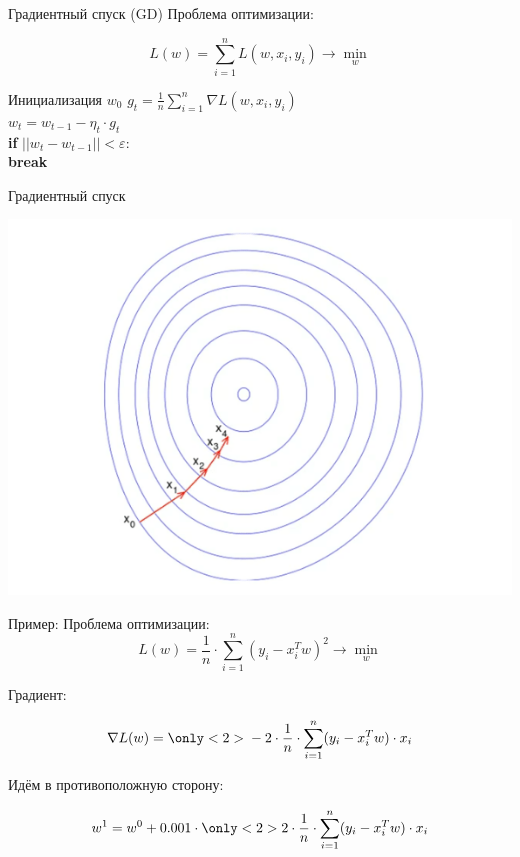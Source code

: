 \documentclass[notes,12pt, aspectratio=169]{beamer}
\newcommand{\pgr}[1]{{\color{green} \textbf{#1}}}
\begin{document}
\begin{frame}[fragile]{Градиентный спуск (GD)}
Проблема оптимизации: 

\[   
L(w) = \sum_{i=1}^n L(w, x_i, y_i) \to \min_{w}
\]

Инициализация $w_0$ 
\hspace{15pt} $g_t = \frac{1}{n}\sum_{i=1}^n  \nabla L(w, x_i, y_i)$ \\
\pgr{\hspace{15pt}} $w_t = w _{t-1} - \eta_t \cdot g_t $ \\
\pgr{\hspace{15pt} if} $||w_t - w_{t-1}|| < \varepsilon:$ \\
\pgr{\hspace{30pt} break}
\end{frame}


\begin{frame}{Градиентный спуск}
\begin{center}
	\includegraphics[width=.6\linewidth]{2dgrad.png}
\end{center}
\end{frame}


\begin{frame}[fragile]{Пример:}
Проблема оптимизации: 
\[   
L(w) = \frac{1}{n} \cdot \sum_{i=1}^n  (y_i - x_i^T w)^2 \to \min_{w}
\]

Градиент: 

\[   
\nabla L(w) =   { \only<2>{ \color{red}} -2 \cdot   \frac{1}{n} \cdot \sum_{i=1}^n (y_i - x_i^T w)\cdot x_i }
\]

Идём в противоположную сторону: 

\[
w^1 =   w^0  +  0.001 \cdot  { \only<2>{ \color{red}}  2 \cdot \frac{1}{n} \cdot \sum_{i=1}^n (y_i - x_i^T w)\cdot x_i } 
\]

\end{frame}
\end{document}
